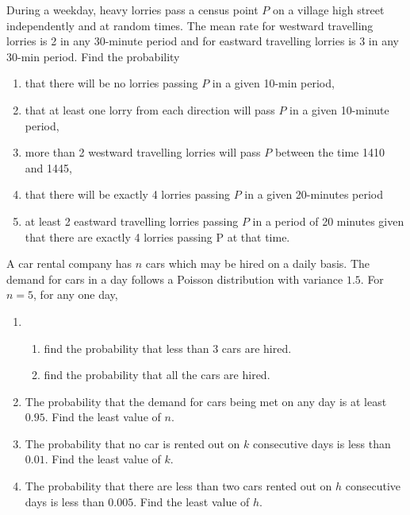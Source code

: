 \begin{problem}
    During a weekday, heavy lorries pass a census point $P$ on a village high street independently and at random times. The mean rate for westward travelling lorries is 2 in any 30-minute period and for eastward travelling lorries is 3 in any 30-min period. Find the probability

    \begin{enumerate}
        \item that there will be no lorries passing $P$ in a given 10-min period,
        \item that at least one lorry from each direction will pass $P$ in a given 10-minute period,
        \item more than 2 westward travelling lorries will pass $P$ between the time 1410 and 1445,
        \item that there will be exactly 4 lorries passing $P$ in a given 20-minutes period
        \item at least 2 eastward travelling lorries passing $P$ in a period of 20 minutes given that there are exactly 4 lorries passing P at that time.
    \end{enumerate}
\end{problem}

\begin{problem}
    A car rental company has $n$ cars which may be hired on a daily basis. The demand for cars in a day follows a Poisson distribution with variance $1.5$. For $n=5$, for any one day,
    \begin{enumerate}
        \item \begin{enumerate}
            \item find the probability that less than 3 cars are hired.
            \item find the probability that all the cars are hired.
        \end{enumerate}
        \item The probability that the demand for cars being met on any day is at least $0.95$. Find the least value of $n$.
        \item The probability that no car is rented out on $k$ consecutive days is less than $0.01$. Find the least value of $k$.
        \item The probability that there are less than two cars rented out on $h$ consecutive days is less than $0.005$. Find the least value of $h$.
    \end{enumerate}
\end{problem}

